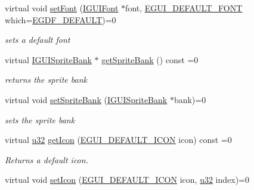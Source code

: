 \begin{DoxyCompactItemize}
\mbox{\label{classirr_1_1gui_1_1IGUISkin_a1e315ed3175b14294ba753911f8423eb}} 
virtual void \hyperlink{classirr_1_1gui_1_1IGUISkin_a1e315ed3175b14294ba753911f8423eb}{set\+Font} (\hyperlink{classirr_1_1gui_1_1IGUIFont}{I\+G\+U\+I\+Font} $\ast$font, \hyperlink{namespaceirr_1_1gui_a9e598ab5e8644d142e55d66e8d308441}{E\+G\+U\+I\+\_\+\+D\+E\+F\+A\+U\+L\+T\+\_\+\+F\+O\+NT} which=\hyperlink{namespaceirr_1_1gui_a9e598ab5e8644d142e55d66e8d308441a48517b1e27e7cf4362c05ed8d5e639bf}{E\+G\+D\+F\+\_\+\+D\+E\+F\+A\+U\+LT})=0
\begin{DoxyCompactList}\small\item\em sets a default font \end{DoxyCompactList}\item 
\mbox{\label{classirr_1_1gui_1_1IGUISkin_a24d886480acfd238f6965adfc8a2a7d6}} 
virtual \hyperlink{classirr_1_1gui_1_1IGUISpriteBank}{I\+G\+U\+I\+Sprite\+Bank} $\ast$ \hyperlink{classirr_1_1gui_1_1IGUISkin_a24d886480acfd238f6965adfc8a2a7d6}{get\+Sprite\+Bank} () const =0
\begin{DoxyCompactList}\small\item\em returns the sprite bank \end{DoxyCompactList}\item 
\mbox{\label{classirr_1_1gui_1_1IGUISkin_a65c467725a7b2cd2bf772b5ae2efac44}} 
virtual void \hyperlink{classirr_1_1gui_1_1IGUISkin_a65c467725a7b2cd2bf772b5ae2efac44}{set\+Sprite\+Bank} (\hyperlink{classirr_1_1gui_1_1IGUISpriteBank}{I\+G\+U\+I\+Sprite\+Bank} $\ast$bank)=0
\begin{DoxyCompactList}\small\item\em sets the sprite bank \end{DoxyCompactList}\item 
virtual \hyperlink{namespaceirr_a0416a53257075833e7002efd0a18e804}{u32} \hyperlink{classirr_1_1gui_1_1IGUISkin_a1b96a5dcaa7ffb9228fc2095be6b18c5}{get\+Icon} (\hyperlink{namespaceirr_1_1gui_a8e54aa253459daf0b62670bda4556d9f}{E\+G\+U\+I\+\_\+\+D\+E\+F\+A\+U\+L\+T\+\_\+\+I\+C\+ON} icon) const =0
\begin{DoxyCompactList}\small\item\em Returns a default icon. \end{DoxyCompactList}\item 
virtual void \hyperlink{classirr_1_1gui_1_1IGUISkin_a7994f1001681b5eabf398b5c4c24c304}{set\+Icon} (\hyperlink{namespaceirr_1_1gui_a8e54aa253459daf0b62670bda4556d9f}{E\+G\+U\+I\+\_\+\+D\+E\+F\+A\+U\+L\+T\+\_\+\+I\+C\+ON} icon, \hyperlink{namespaceirr_a0416a53257075833e7002efd0a18e804}{u32} index)=0

\end{DoxyCompactItemize}
